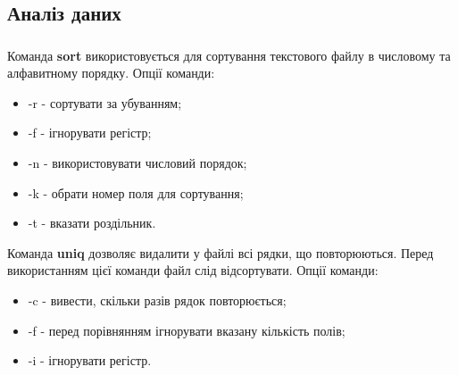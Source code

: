 \documentclass[t]{beamer}  %
\begin{document}
\subsection{Аналіз даних}

\begin{frame}
	\frametitle{\insertsection} 
	\framesubtitle{\insertsubsection}
Команда \textbf{sort} використовується для сортування текстового файлу в числовому та алфавитному порядку. Опції команди:
\begin{itemize}
  \item -r - сортувати за убуванням;
  \item -f - ігнорувати регістр;
  \item -n - використовувати числовий порядок;
  \item -k - обрати номер поля для сортування;
  \item -t - вказати роздільник.
\end{itemize}
Команда \textbf{uniq} дозволяє видалити у файлі всі рядки, що повторюються. Перед використанням цієї команди файл слід відсортувати. Опції команди:
\begin{itemize}
  \item -c - вивести, скільки разів рядок повторюється;
  \item -f - перед порівнянням ігнорувати вказану кількість полів;
  \item -i - ігнорувати регістр.
\end{itemize} 
\end{frame}
\end{document}
